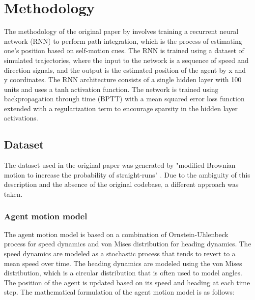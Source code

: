 \documentclass{article}
\begin{document}
\section{Methodology}
The methodology of the original paper by \cite{chaplot2018active} involves training a recurrent neural network (RNN) to perform path integration, which is the process of estimating one's position based on self-motion cues. The RNN is trained using a dataset of simulated trajectories, where the input to the network is a sequence of speed and direction signals, and the output is the estimated position of the agent by x and y coordinates. The RNN architecture consists of a single hidden layer with 100 units and uses a tanh activation function. The network is trained using backpropagation through time (BPTT) with a mean squared error loss function extended with a regularization term to encourage sparsity in the hidden layer activations. 

\subsection{Dataset}
The dataset used in the original paper was generated by "modified Brownian motion to increase the
probability of straight-runs" \citep{chaplot2018active}. Due to the ambiguity of this description and the absence of the original codebase, a different approach was taken. 

\subsubsection{Agent motion model}
The agent motion model is based on a combination of Ornstein-Uhlenbeck process for speed dynamics and von Mises distribution for heading dynamics. The speed dynamics are modeled as a stochastic process that tends to revert to a mean speed over time. The heading dynamics are modeled using the von Mises distribution, which is a circular distribution that is often used to model angles. The position of the agent is updated based on its speed and heading at each time step. The mathematical formulation of the agent motion model is as follows: 
\end{document}

